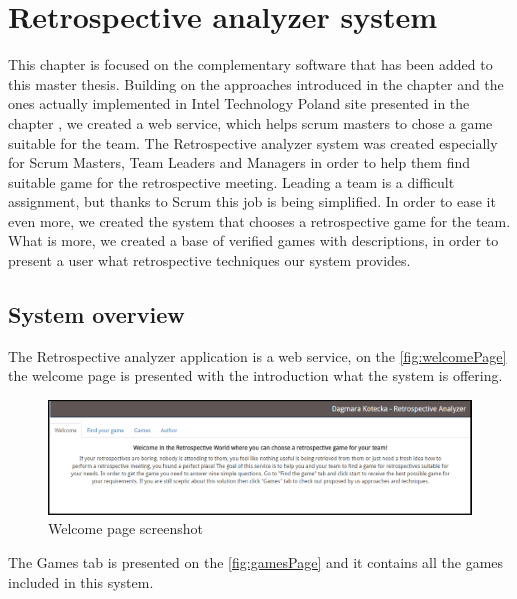 \chapter{Retrospective analyzer system}

This chapter is focused on the complementary software that has been added to this master thesis. Building on the approaches introduced in the chapter  and the ones actually implemented in Intel Technology Poland site presented in the chapter , we created a web service, which helps scrum masters to chose a game suitable for the team.
The Retrospective analyzer system was created especially for Scrum Masters, Team Leaders and Managers in order to help them find suitable game for the retrospective meeting. Leading a team is a difficult assignment, but thanks to Scrum this job is being simplified. In order to ease it even more, we created the system that chooses a retrospective game for the team. What is more, we created a base of verified games with descriptions, in order to present a user what retrospective techniques our system provides. 

\section{System overview}

The Retrospective analyzer application is a web service, on the \autoref{fig:welcomePage} the welcome page is presented with the introduction what the system is offering.

\begin{figure}[h]
\caption{Welcome page screenshot}
\label{fig:welcomePage}
\centering
\includegraphics[width=1\textwidth]{screenshots/welcome.png}
\end{figure}

The Games tab is presented on the \autoref{fig:gamesPage} and it contains all the games included in this system.

